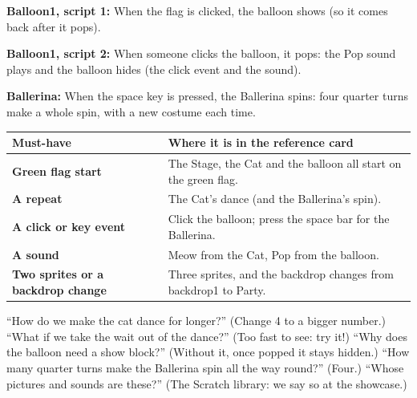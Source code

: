 \documentclass[track=junior,level=1,teacher]{kidscode}
\newenvironment{refscript}[2]{\par\needspace{8\baselineskip}\noindent\textbf{\color{kcaccent}#1:} #2\par\smallskip\begin{center}\begin{scratch}[scale=0.8]}{\end{scratch}\end{center}}
\begin{document}
\begin{refscript}{Balloon1, script 1}{When the flag is clicked, the balloon shows (so it comes back after it pops).}
\end{refscript}

\begin{refscript}{Balloon1, script 2}{When someone clicks the balloon, it pops: the Pop sound plays and the balloon hides (the click event and the sound).}
\end{refscript}

\begin{refscript}{Ballerina}{When the space key is pressed, the Ballerina spins: four quarter turns make a whole spin, with a new costume each time.}
\end{refscript}

\begin{center}\small\renewcommand{\arraystretch}{1.3}
\begin{tabularx}{\linewidth}{@{}>{\bfseries}p{4.6cm}X@{}}
\toprule
Must-have & Where it is in the reference card\\
\midrule
Green flag start & The Stage, the Cat and the balloon all start on the green flag.\\
A repeat & The Cat's dance (and the Ballerina's spin).\\
A click or key event & Click the balloon; press the space bar for the Ballerina.\\
A sound & Meow from the Cat, Pop from the balloon.\\
Two sprites or a backdrop change & Three sprites, and the backdrop changes from backdrop1 to Party.\\
\bottomrule
\end{tabularx}
\end{center}

\begin{tip}
\enquote{How do we make the cat dance for longer?} (Change 4 to a bigger number.)
\enquote{What if we take the wait out of the dance?} (Too fast to see: try it!)
\enquote{Why does the balloon need a show block?} (Without it, once popped it stays hidden.)
\enquote{How many quarter turns make the Ballerina spin all the way round?} (Four.)
\enquote{Whose pictures and sounds are these?} (The Scratch library: we say so at the showcase.)
\end{tip}
\end{document}
